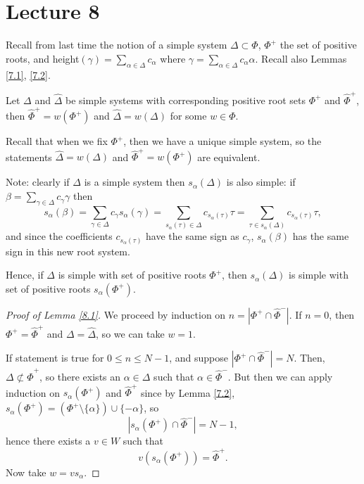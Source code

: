 \section{Lecture 8}

Recall from last time the notion of a simple system $\Delta \subset \Phi$,
$\Phi^+$ the set of positive roots, and height$(\gamma) = \sum_{\alpha \in \Delta}
c_\alpha$ where $\gamma = \sum_{\alpha \in \Delta} c_\alpha \alpha$. Recall also
Lemmas \ref{7.1}, \ref{7.2}.

\begin{lemma} \label{8.1}
Let $\Delta$ and $\hat{\Delta}$ be simple systems with corresponding positive
root sets $\Phi^+$ and $\hat{\Phi}^+$, then $\hat{\Phi}^+ = w(\Phi^+)$ and
$\hat{\Delta} = w(\Delta)$ for some $w \in \Phi$.
\end{lemma}

Recall that when we fix $\Phi^+$, then we have a unique simple system, so the
statements $\hat{\Delta} = w(\Delta)$ and $\hat{\Phi}^+ = w(\Phi^+)$ are
equivalent.

Note: clearly if $\Delta$ is a simple system then $s_\alpha(\Delta)$ is also
simple: if $\beta = \sum_{\gamma \in \Delta} c_\gamma \gamma$ then
\[
    s_\alpha(\beta) = \sum_{\gamma \in \Delta} c_\gamma s_\alpha(\gamma)
    = \sum_{s_\alpha(\tau) \in \Delta} c_{s_\alpha(\tau)} \tau
    = \sum_{\tau \in s_\alpha(\Delta)} c_{s_\alpha(\tau)} \tau,
\]
and since the coefficients $c_{s_\alpha(\tau)}$ have the same sign as $c_\gamma$,
$s_\alpha(\beta)$ has the same sign in this new root system.

Hence, if $\Delta$ is simple with set of positive roots $\Phi^+$, then
$s_\alpha(\Delta)$ is simple with set of positive roots $s_\alpha(\Phi^+)$.

\begin{proof}[Proof of Lemma \ref{8.1}]
We proceed by induction on $n = |\Phi^+ \cap \hat{\Phi}^-|$.
If $n = 0$, then $\Phi^+ = \hat{\Phi}^+$ and $\Delta = \hat{\Delta}$, so we can
take $w = 1$.

If statement is true for $0 \leq n \leq N-1$, and suppose
$|\Phi^+ \cap \hat{\Phi}^-| = N$. Then, $\Delta \not\subset \hat{\Phi}^+$, so
there exists an $\alpha \in \Delta$ such that $\alpha \in \hat{\Phi}^-$. But
then we can apply induction on $s_\alpha(\Phi^+)$ and $\hat{\Phi}^+$ since by
Lemma \ref{7.2}, $s_\alpha(\Phi^+) = (\Phi^+ \setminus \{\alpha\}) \cup \{-\alpha\}$,
so
\[
    \left| s_\alpha(\Phi^+) \cap \hat{\Phi}^- \right| = N-1,
\]
hence there exists a $v \in W$ such that
\[
    v(s_\alpha(\Phi^+)) = \hat{\Phi}^+.
\]
Now take $w = vs_\alpha$.
\end{proof}

